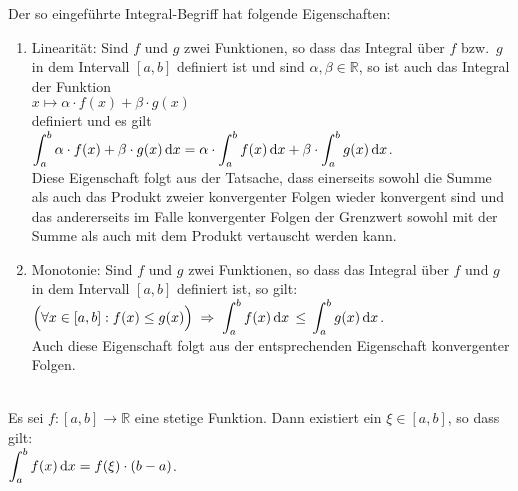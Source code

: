 \noindent
Der so eingef\"uhrte Integral-Begriff hat folgende Eigenschaften:
\begin{enumerate}
\item Linearit\"at: Sind $f$ und $g$ zwei Funktionen, so dass
      das Integral \"uber $f$ bzw.~$g$ in dem Inter\-vall $[a,b]$ definiert ist
      und sind $\alpha,\beta \in\mathbb{R}$,
      so ist auch das Integral der Funktion
      \\[0.2cm]
      \hspace*{1.3cm} $x \mapsto \alpha\cdot f(x) + \beta\cdot g(x)$ \\[0.2cm]
      definiert und es gilt 
      \\[0.2cm]
      \hspace*{1.3cm}
      $\displaystyle\int_a^b \alpha\cdot f(x) + \beta\cdot g(x)\,\textrm{d} x = \alpha\cdot \int_a^b f(x)\,\textrm{d} x + \beta\cdot \int_a^b g(x)\,\textrm{d} x$.
      \\[0.2cm]
      Diese Eigenschaft folgt aus der Tatsache, dass einerseits sowohl die Summe als auch das
      Produkt zweier konvergenter Folgen wieder konvergent sind und das andererseits im Falle
      konvergenter Folgen der Grenzwert sowohl mit der Summe als auch mit dem Produkt vertauscht
      werden kann.
\item Monotonie:  Sind $f$ und $g$ zwei Funktionen, so dass
      das Integral \"uber $f$ und  $g$ in dem Intervall $[a,b]$ definiert ist, so gilt: 
      \\[0.2cm]
      \hspace*{1.3cm}
      $\displaystyle\Bigl(\forall x \in [a,b]: f(x) \leq g(x)\Bigr) \;\Rightarrow\;
       \int_a^b f(x)\, \textrm{d} x \,\leq\, \int_a^b g(x)\, \textrm{d} x$.
      \\[0.2cm] 
      Auch diese Eigenschaft folgt aus der entsprechenden Eigenschaft konvergenter Folgen.
\end{enumerate}


\begin{Satz} \hspace*{\fill} \\
Es sei $f:[a,b] \rightarrow \mathbb{R}$ eine stetige Funktion. Dann existiert ein $\xi \in [a,b]$, so dass gilt:
\\[0.2cm]
\hspace*{1.3cm}
$\displaystyle\int_a^b f(x) \,\textrm{d} x = f(\xi) \cdot  (b - a)$.
\end{Satz}


